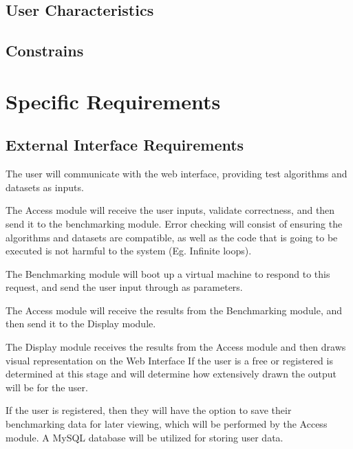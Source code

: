 \documentclass[runningheads,a4paper]{article}
\begin{document}



\subsection{User Characteristics}
\subsection{Constrains}






\section{Specific Requirements}
	\subsection{External Interface Requirements}
		\begin{EIREnum}
			\item The user will communicate with the web interface, providing test algorithms and datasets as inputs.
			\item The Access module will receive the user inputs, validate correctness, and then send it to the benchmarking module. \newline
				Error checking will consist of ensuring the algorithms and datasets are compatible, as well as the code that is going to be executed is not harmful to the system (Eg. Infinite loops).
			\item The Benchmarking module will boot up a virtual machine to respond to this request, and send the user input through as parameters.
			\item The Access module will receive the results from the Benchmarking module, and then send it to the Display module.
			\item The Display module receives the results from the Access module and then draws visual representation on the Web Interface \newline
				If the user is a free or registered is determined at this stage and will determine how extensively drawn the output will be for the user.
			\item If the user is registered, then they will have the option to save their benchmarking data for later viewing, which will be performed by the Access module. \newline
				A MySQL database will be utilized for storing user data.
		\end{EIREnum}
	
\end{document}
